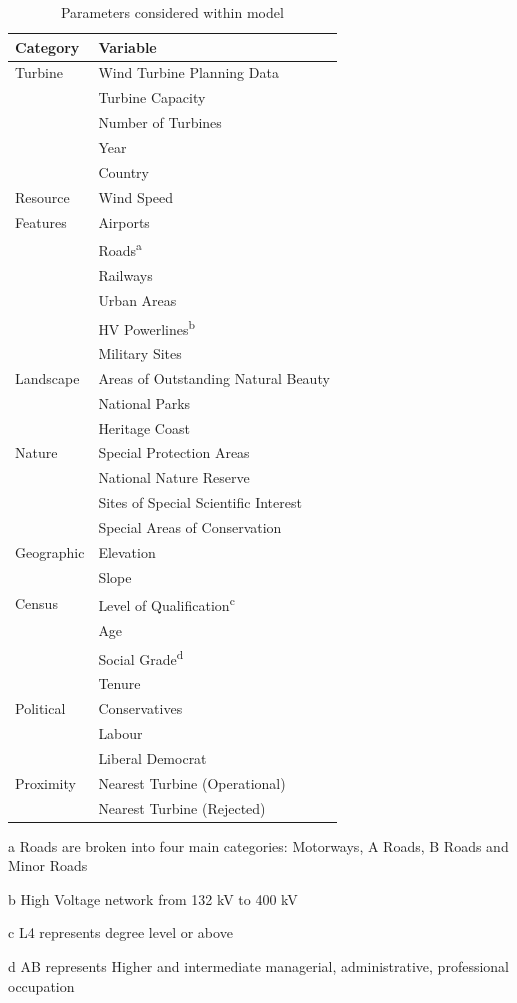 \documentclass[a4paper,]{article}
\theoremstyle{definition}
\theoremstyle{definition}
\theoremstyle{definition}
\theoremstyle{remark}
\begin{document}
\begin{table}[t]

\caption{\label{tab:SummaryTable}Parameters considered within model}
\centering
\begin{threeparttable}
\begin{tabular}{ll}
\toprule
Category & Variable\\
\midrule
Turbine & Wind Turbine Planning Data\\
 & Turbine Capacity\\
 & Number of Turbines\\
 & Year\\
 & Country\\
Resource & Wind Speed\\
Features & Airports\\
 & Roads\textsuperscript{a}\\
 & Railways\\
 & Urban Areas\\
 & HV Powerlines\textsuperscript{b}\\
 & Military Sites\\
Landscape & Areas of Outstanding Natural Beauty\\
 & National Parks\\
 & Heritage Coast\\
Nature & Special Protection Areas\\
 & National Nature Reserve\\
 & Sites of Special Scientific Interest\\
 & Special Areas of Conservation\\
Geographic & Elevation\\
 & Slope\\
Census & Level of Qualification\textsuperscript{c}\\
 & Age\\
 & Social Grade\textsuperscript{d}\\
 & Tenure\\
Political & Conservatives\\
 & Labour\\
 & Liberal Democrat\\
Proximity & Nearest Turbine (Operational)\\
 & Nearest Turbine (Rejected)\\
\bottomrule
\end{tabular}
\begin{tablenotes}
\item[a] Roads are broken into four main categories: Motorways, A Roads, B Roads and Minor Roads
\item[b] High Voltage network from 132 kV to 400 kV
\item[c] L4 represents degree level or above
\item[d] AB represents Higher and intermediate managerial, administrative, professional occupation
\end{tablenotes}
\end{threeparttable}
\end{table}
\end{document}
